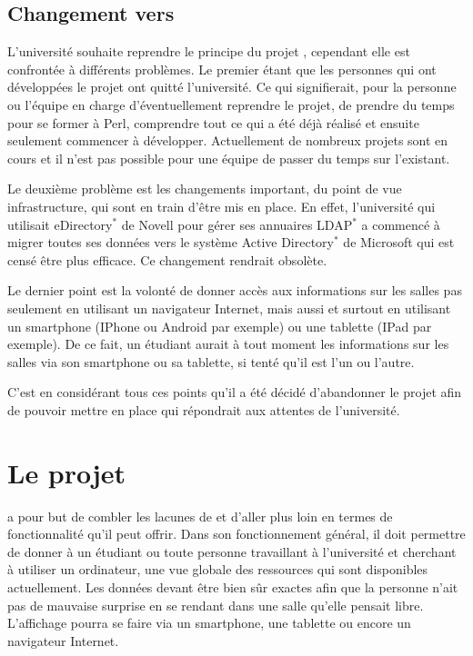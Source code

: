 \subsection{Changement vers \YuukouII}

L'universit\'e souhaite reprendre le principe du projet \Yuukou, cependant elle est confront\'ee \`a diff\'erents probl\`emes.
Le premier \'etant que les personnes qui ont d\'evelopp\'ees le projet ont quitt\'e l'universit\'e. 
Ce qui signifierait, pour la personne ou l'\'equipe en charge d'\'eventuellement reprendre le projet, de prendre du temps pour se former \`a Perl, comprendre tout ce qui a \'et\'e d\'ej\`a r\'ealis\'e et ensuite seulement commencer \`a d\'evelopper.
Actuellement de nombreux projets sont en cours et il n'est pas possible pour une \'equipe de passer du temps sur l'existant.

Le deuxi\`eme probl\`eme est les changements important, du point de vue infrastructure, qui sont en train d'\^etre mis en place.
En effet, l'universit\'e qui utilisait eDirectory$^*$ de Novell pour g\'erer ses annuaires LDAP$^*$ a commenc\'e \`a migrer toutes ses donn\'ees vers le syst\`eme Active Directory$^*$ de Microsoft qui est cens\'e \^etre plus efficace. Ce changement rendrait \Yuukou{} obsol\`ete.

Le dernier point est la volont\'e de donner acc\`es aux informations sur les salles pas seulement en utilisant un navigateur Internet, mais aussi et surtout en utilisant un smartphone (IPhone ou Android par exemple) ou une tablette (IPad par exemple).
De ce fait, un \'etudiant aurait \`a tout moment les informations sur les salles via son smartphone ou sa tablette, si tent\'e qu'il est l'un ou l'autre.

C'est en consid\'erant tous ces points qu'il a \'et\'e d\'ecid\'e d'abandonner le projet \Yuukou{} afin de pouvoir mettre en place \YuukouII{} qui r\'epondrait aux attentes de l'universit\'e.

\section{Le projet \YuukouII}


\YuukouII{} a pour but de combler les lacunes de \Yuukou{} et d'aller plus loin en termes de fonctionnalit\'e qu'il peut offrir. 
Dans son fonctionnement g\'en\'eral, il doit permettre de donner \`a un \'etudiant ou toute personne travaillant \`a l'universit\'e et cherchant \`a utiliser un ordinateur, une vue globale des ressources qui sont disponibles actuellement.
Les donn\'ees devant \^etre bien s\^ur exactes afin que la personne n'ait pas de mauvaise surprise en se rendant dans une salle qu'elle pensait libre.
L'affichage pourra se faire via un smartphone, une tablette ou encore un navigateur Internet.

